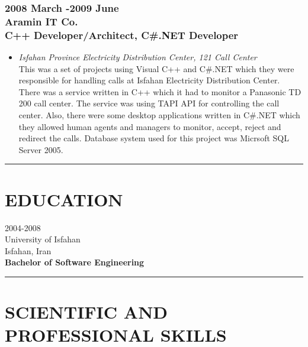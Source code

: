\documentclass[10pt,a4paper]{article}
\begin{document}
\subsubsection{\textnormal {2008 March -2009 June} \\ \textnormal {Aramin IT Co.} \\ C++ Developer/Architect, C\#.NET Developer}
  \setlength{\leftskip}{0.5cm}
  \setlength{\rightskip}{1cm}
  \begin{itemize}
    \item \small \textit{Isfahan Province Electricity Distribution Center, 121 Call Center} \\					
		This was a set of projects using Visual C++ and C\#.NET which they were responsible for handling calls at Isfahan Electricity Distribution Center. There was a service written in C++ which it had to monitor a Panasonic TD 200 call center. The service was using TAPI API for controlling the call center. Also, there were some desktop applications written in C\#.NET which they allowed human agents and managers to monitor, accept, reject and redirect the calls. Database system used for this project was Micrsoft SQL Server 2005.
	\end{itemize}
  \setlength{\leftskip}{0pt}
  \setlength{\rightskip}{0cm}

\rule {14cm}{0.4pt}

\section{EDUCATION}

2004-2008 \\
University of Isfahan \\
Isfahan, Iran \\
\textbf{Bachelor of Software Engineering}

\rule {14cm}{0.4pt}

\section{SCIENTIFIC AND PROFESSIONAL SKILLS}
\end{document}
